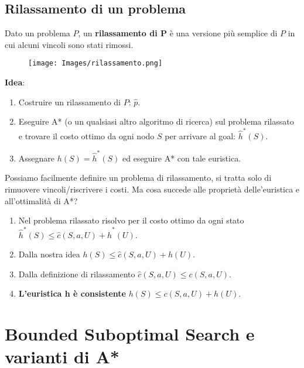 \documentclass{article}
\begin{document}
\subsection{Rilassamento di un problema}
Dato un problema $P$, un \textbf{rilassamento di P} è una versione più semplice di $P$ in cui alcuni vincoli sono stati rimossi.
\begin{figure} [H]
  \centering\texttt{[image: Images/rilassamento.png]}
\end{figure}
\textbf{Idea}:
\begin{enumerate}
    \item Costruire un rilassamento di $P$: $\hat{p}$.
    \item Eseguire A* (o un qualsiasi altro algoritmo di ricerca) sul problema rilassato e trovare il costo ottimo da ogni nodo $S$ per arrivare al goal: $\hat{h}^*(S)$.
    \item Assegnare $h(S) = \hat{h}^*(S)$ ed eseguire A* con tale euristica.
\end{enumerate}
Possiamo facilmente definire un problema di rilassamento, si tratta solo di rimuovere vincoli/riscrivere i costi. Ma cosa succede alle proprietà delle'euristica e all'ottimalità di A*?
\begin{enumerate}
    \item Nel problema rilassato risolvo per il costo ottimo da ogni stato $\hat{h}^*(S) \leq \hat{c}(S,a,U) + \hat{h}^*(U)$.
    \item Dalla nostra idea $h(S)\leq \hat{c}(S,a,U)+h(U)$.
    \item Dalla definizione di rilassamento $\hat{c}(S,a,U) \leq c(S,a,U)$.
    \item \textbf{L'euristica h è consistente} $h(S)\leq c(S,a,U)+h(U)$.
\end{enumerate}
\break
\section{Bounded Suboptimal Search e varianti di A* }
\end{document}
